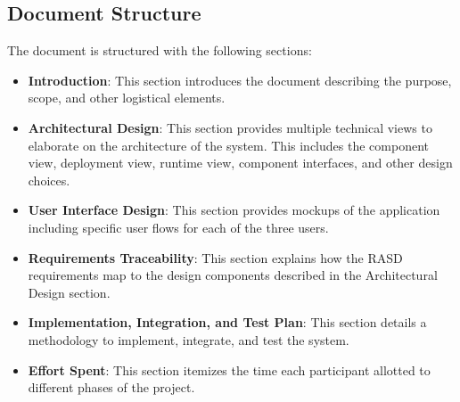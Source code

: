 \subsection{Document Structure}
The document is structured with the following sections:
\begin{itemize}
\item \textbf{Introduction}: This section introduces the document describing the purpose, scope, and other logistical elements.
\item \textbf{Architectural Design}: This section provides multiple technical views to elaborate on the architecture of the system. This includes the component view, deployment view, runtime view, component interfaces, and other design choices.
\item \textbf{User Interface Design}: This section provides mockups of the application including specific user flows for each of the three users.
\item \textbf{Requirements Traceability}: This section explains how the RASD requirements map to the design components described in the Architectural Design section.
\item \textbf{Implementation, Integration, and Test Plan}: This section details a methodology to implement, integrate, and test the system.
\item \textbf{Effort Spent}: This section itemizes the time each participant allotted to different phases of the project. 
\end{itemize}




